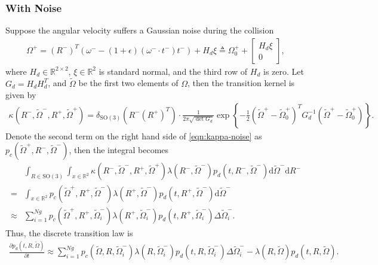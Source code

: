\documentclass[10pt]{article}
\newcommand{\SO}{\ensuremath{\mathrm{SO}(3)}}
\newcommand{\diff}[1]{\mathrm{d}#1}
\newcommand{\real}{\ensuremath{\mathbb{R}}}
\begin{document}
\subsubsection{With Noise}
Suppose the angular velocity suffers a Gaussian noise during the collision
\begin{align}
	\Omega^+ = (R^-)^T\left( \omega^- - (1+\epsilon)(\omega^- \cdot t^-) t^- \right) + H_d\xi \triangleq \Omega^+_0 + \begin{bmatrix} H_d\xi \\ 0 \end{bmatrix},
\end{align}
where $H_d\in\real^{2\times 2}$, $\xi\in\real^2$ is standard normal, and the third row of $H_d$ is zero.
Let $G_d = H_dH_d^T$, and $\tilde{\Omega}$ be the first two elements of $\Omega$, then the transition kernel is given by
\begin{align} \label{eqn:kappa-noise}
	\kappa(R^-,\tilde{\Omega}^-,R^+,\tilde{\Omega}^+) = \delta_{\SO}(R^-(R^+)^T) \cdot \frac{1}{2\pi\sqrt{\det G_d}} \exp\left\{ -\tfrac{1}{2} \left(\tilde{\Omega}^+ - \tilde{\Omega}_0^+\right)^T G_d^{-1} \left(\tilde{\Omega}^+ - \tilde{\Omega}_0^+\right) \right\}.
\end{align}
Denote the second term on the right hand side of \eqref{eqn:kappa-noise} as $p_c(\tilde{\Omega}^+,R^-,\tilde{\Omega}^-)$, then the integral becomes
\begin{align}
	&\int_{R\in\SO} \int_{x\in\real^2} \kappa(R^-,\tilde{\Omega}^-,R^+,\tilde{\Omega}^+) \lambda(R^-,\tilde{\Omega}^-) p_d(t,R^-,\tilde{\Omega}^-) \diff{\tilde{\Omega}^-} \diff{R^-} \nonumber \\
	= &\int_{x\in\real^2} p_c(\tilde{\Omega}^+,R^+,\tilde{\Omega}^-) \lambda(R^+,\tilde{\Omega}^-) p_d(t,R^+,\tilde{\Omega}^-) \diff{\tilde{\Omega}^-} \\
	\approx & \sum_{i=1}^{Ng} p_c(\tilde{\Omega}^+,R^+,\tilde{\Omega}^-_i) \lambda(R^+,\tilde{\Omega}^-_i) p_d(t,R^+,\tilde{\Omega}^-_i) \Delta \tilde{\Omega}^-_i.
\end{align}
Thus, the discrete transition law is
\begin{align}
	\frac{\partial p_d(t,R,\tilde{\Omega})}{\partial t} \approx \sum_{i=1}^{Ng} p_c(\tilde{\Omega},R,\tilde{\Omega}^-_i) \lambda(R,\tilde{\Omega}^-_i) p_d(t,R,\tilde{\Omega}^-_i) \Delta \tilde{\Omega}^-_i - \lambda(R,\tilde{\Omega}) p_d(t,R,\tilde{\Omega}).
\end{align}
\end{document}
